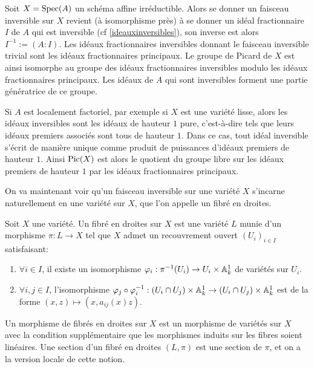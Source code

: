 \begin{ex}\label{expicaff}
Soit $X=\operatorname{Spec} (A)$ un schéma affine irréductible. Alors se donner un faisceau inversible sur $X$ revient (à isomorphisme près) à se donner un idéal fractionnaire $I$ de $A$ qui est inversible (cf \ref{ideauxinversibles}), son inverse est alors $I^{-1}:=(A:I)$. Les idéaux fractionnaires inversibles donnant le faisceau inversible trivial sont les idéaux fractionnaires principaux. Le groupe de Picard de $X$ est ainsi isomorphe au groupe des idéaux fractionnaires inversibles modulo les idéaux fractionnaires principaux. Les idéaux de $A$ qui sont inversibles forment une partie génératrice de ce groupe. 

Si $A$ est localement factoriel, par exemple si $X$ est une variété lisse, alors les idéaux inversibles sont les idéaux de hauteur $1$ pure, c'est-à-dire tels que leurs idéaux premiers associés sont tous de hauteur $1$. Dans ce cas, tout idéal inversible s'écrit de manière unique comme produit de puissances d'idéaux premiers de hauteur $1$. Ainsi $\operatorname{Pic}(X)$ est alors le quotient du groupe libre sur les idéaux premiers de hauteur $1$ par les idéaux fractionnaires principaux.
\end{ex}

On va maintenant voir qu'un faisceau inversible sur une variété $X$ s'incarne naturellement en une variété sur $X$, que l'on appelle un fibré en droites.

\begin{defn}\label{linebundle}
Soit $X$ une variété. Un fibré en droites sur $X$ est une variété $L$ munie d'un morphisme $\pi:L\rightarrow X$ tel que $X$ admet un recouvrement ouvert $(U_i)_{i\in I}$ satisfaisant:

\begin{enumerate}
\item $\forall i\in I$, il existe un isomorphisme $\varphi_i :\pi^{-1}(U_i)\rightarrow U_i\times\mathbb{A}^1_k$ de variétés sur $U_i$.
\item $\forall i, j\in I$, l'isomorphisme $\varphi_j\circ \varphi_i^{-1}: (U_i\cap U_j)\times \mathbb{A}^1_k\rightarrow (U_i\cap U_j)\times \mathbb{A}^1_k$ est de la forme $(x, z)\mapsto (x, a_{ij}(x)z)$.
\end{enumerate}
Un morphisme de fibrés en droites sur $X$ est un morphisme de variétés sur $X$ avec la condition supplémentaire que les morphismes induits sur les fibres soient linéaires.
Une section d'un fibré en droites $(L, \pi)$ est une section de $\pi$, et on a la version locale de cette notion.
\end{defn}

